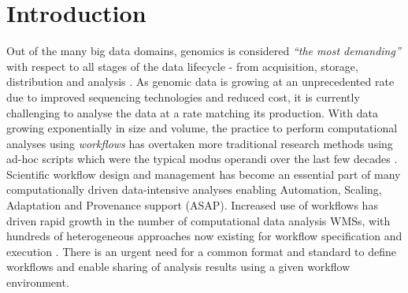 \documentclass[a4paper,num-refs]{oup-contemporary}
\begin{document}
\section{Introduction} \label{sec:introduction}
Out of the many big data domains, genomics is considered \textit{``the most demanding''} with respect to all stages of the data lifecycle - from acquisition, storage, distribution and analysis \citep{stephens_2015}. As genomic data is growing at an unprecedented rate due to improved sequencing technologies and reduced cost, it is currently challenging to analyse the data at a rate matching its production. With data growing exponentially in size and volume, the practice to perform computational analyses using \textit{workflows} has overtaken more traditional research methods using ad-hoc scripts which were the typical modus operandi over the last few decades \citep{atkinson_2017, Spjuth2015}. Scientific workflow design and management has become an essential part of many computationally driven data-intensive analyses enabling Automation, Scaling, Adaptation and Provenance support (ASAP)\citep{cuevasvicenttn_2012}. Increased use of workflows has driven rapid growth in the number of computational data analysis WMSs, with hundreds of heterogeneous approaches now existing for workflow specification and execution \citep{cwl-existing-workflow-systems}. There is an urgent need for a common format and standard to define workflows and enable sharing of analysis results using a given workflow environment. 
\end{document}
